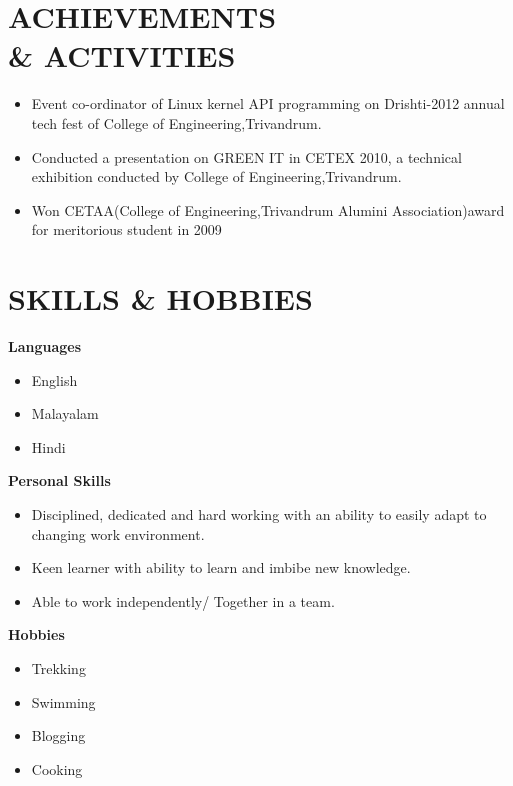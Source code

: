\documentclass[line,margin]{res}
\begin{document}
\begin{resume}
          \section{ACHIEVEMENTS \\ \& ACTIVITIES}
		  \begin{itemize} \itemsep -1pt
		  \item Event co-ordinator of Linux kernel API programming on Drishti-2012 annual tech fest of College of Engineering,Trivandrum.
		  \item Conducted a presentation on GREEN IT in CETEX 2010, a technical exhibition conducted by College of Engineering,Trivandrum.
		  \item Won CETAA(College of Engineering,Trivandrum Alumini Association)award for meritorious student in 2009
		  \end{itemize}
	  \section{SKILLS \& HOBBIES}
	          {\bf Languages}
	          \begin{itemize} \itemsep -2pt
	          \item English
	          \item Malayalam
		  	  \item Hindi
	          \end{itemize}
	          {\bf Personal Skills}
	          \begin{itemize} \itemsep -2pt
	          \item Disciplined, dedicated and hard working with an ability to easily adapt to changing work environment.
	          \item Keen learner with ability to learn and imbibe new knowledge.
	          \item Able to work independently/ Together in a team.
	          \end{itemize}
	          {\bf Hobbies}
	          \begin{itemize} \itemsep -2pt
	          \item Trekking
	          \item Swimming
		  	  \item Blogging
			  \item Cooking
	          \end{itemize}
	          \vspace{10 mm}                                 

\end{resume}
\end{document}
